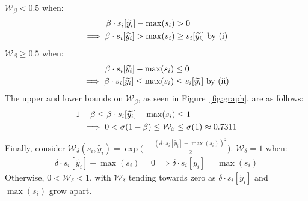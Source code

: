 \documentclass{article}
\theoremstyle{plain}
\theoremstyle{definition}
\theoremstyle{remark}
\begin{document}
\noindent$\mathcal{W}_\beta < 0.5$ when:
\vspace{-0.5em}
\begin{align}
    \beta \cdot s_i[\widetilde{y_i}] - \max(s_i) &> 0 \\
    \implies \beta \cdot s_i[\widetilde{y_i}] > \max(s_i) &\geq s_i[\widetilde{y_i}] \text{ by (i)}
    \vspace{-0.5em}
\end{align}
$\mathcal{W}_\beta \geq 0.5$ when:
\vspace{-0.5em}
\begin{align}
    \beta \cdot s_i[\widetilde{y_i}] - \max(s_i) &\leq 0 \\ 
    \implies \beta \cdot s_i[\widetilde{y_i}] \leq \max(s_i) &\leq s_i[\widetilde{y_i}] \text{ by (ii)}
    \vspace{-0.5em}
\end{align}
The upper and lower bounds on $\mathcal{W}_\beta$, as seen in Figure~\ref{fig:graph}, are as follows:
\vspace{-0.5em}
\begin{align}
    1-\beta \leq \beta \cdot s_i[\widetilde{y_i}] - \max(s_i) &\leq 1 \\
    \implies 0 < \sigma(1-\beta) \leq \mathcal{W}_\beta &\leq \sigma(1) \approx 0.7311
    \vspace{-0.5em}
\end{align}
Finally, consider $\mathcal{W}_\delta (s_i, \widetilde{y_i}) = \exp\bigl(-\frac{(\delta \cdot s_i[\widetilde{y_i}] - \max(s_i))^2}{2}\bigr)$. $\mathcal{W}_\delta = 1$ when:
\vspace{-0.5em}
\begin{align}
    \delta \cdot s_i[\widetilde{y_i}] - \max(s_i) = 0 \implies
    \delta \cdot s_i[\widetilde{y_i}] = \max(s_i)
\end{align}
Otherwise, $0 < \mathcal{W}_\delta < 1$, with $\mathcal{W}_\delta$ tending towards zero as $\delta \cdot s_i[\widetilde{y_i}]$ and $\max(s_i)$ grow apart.
\end{document}
